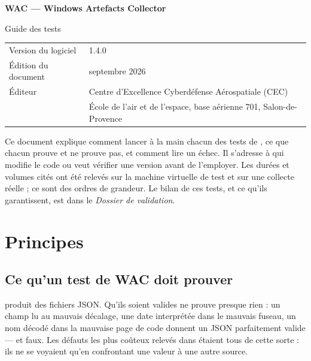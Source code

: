 \documentclass[11pt,a4paper,oneside]{report}
\begin{document}

\thispagestyle{empty}
\vspace*{\fill}
{\color{marine}\Large\bfseries WAC — Windows Artefacts Collector}\par
{\color{bleu}Guide des tests}\par
\medskip
\begin{tabular}{@{}ll@{}}
Version du logiciel & 1.4.0 \\
Édition du document & septembre 2026 \\
Éditeur & Centre d'Excellence Cyberdéfense Aérospatiale (CEC) \\
        & École de l'air et de l'espace, base aérienne 701, Salon-de-Provence \\
\end{tabular}

\bigskip
{\small\color{gris}Ce document explique comment lancer à la main chacun des
tests de \wac{}, ce que chacun prouve et ne prouve pas, et comment lire un
échec. Il s'adresse à qui modifie le code ou veut vérifier une version avant
de l'employer. Les durées et volumes cités ont été relevés sur la machine
virtuelle de test et sur une collecte réelle ; ce sont des ordres de
grandeur. Le bilan de ces tests, et ce qu'ils garantissent, est dans le
\emph{Dossier de validation}.}
\vspace*{2cm}
\clearpage

\tableofcontents

\chapter{Principes}

\section{Ce qu'un test de WAC doit prouver}

\wac{} produit des fichiers JSON. Qu'ils soient valides ne prouve presque rien :
un champ lu au mauvais décalage, une date interprétée dans le mauvais fuseau,
un nom décodé dans la mauvaise page de code donnent un JSON parfaitement
valide — et faux. Les défauts les plus coûteux relevés dans \wac{} étaient tous
de cette sorte : ils ne se voyaient qu'en confrontant une valeur à une autre
source.
\end{document}
